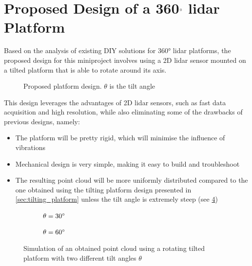 \section{Proposed Design of a 360$\degree$ \gls{lidar} Platform}
\label{sec:proposed_design}
Based on the analysis of existing DIY solutions for 360° \gls{lidar} platforms, the proposed design for this miniproject involves using a 2D \gls{lidar} sensor mounted on a tilted platform that is able to rotate around its axis.
\begin{figure}[H]
    \caption{Proposed platform design. \protect$\theta$ is the tilt angle}
    
    \label{fig:tikz_platform}
\end{figure}
This design leverages the advantages of 2D \gls{lidar} sensors, such as fast data acquisition and high resolution, while also eliminating some of the drawbacks of previous designs, namely:
\begin{itemize}[label=\textcolor{green!60!black}{\textbf{+}}]
    \item The platform will be pretty rigid, which will minimise the influence of vibrations
    \item Mechanical design is very simple, making it easy to build and troubleshoot
    \item The resulting point cloud will be more uniformly distributed compared to the one obtained using the tilting platform design presented in \cref{sec:tilting_platform} unless the tilt angle is extremely steep (see \cref{fig:rotate_pointCloud})
\end{itemize}
\begin{figure}[h!]
    \centering
    
    \begin{subfigure}{0.45\linewidth}
        \centering
        
        \caption{$\theta=30\degree$}
        \label{fig:rotate_pointCloud:30}
    \end{subfigure}
    \hfill
    \begin{subfigure}{0.45\linewidth}
        \centering
        
        \caption{$\theta=60\degree$}
        \label{fig:rotate_pointCloud:60}
    \end{subfigure}

    \caption{Simulation of an obtained point cloud using a rotating tilted platform with two different tilt angles $\theta$}
    \label{fig:rotate_pointCloud}
\end{figure}

